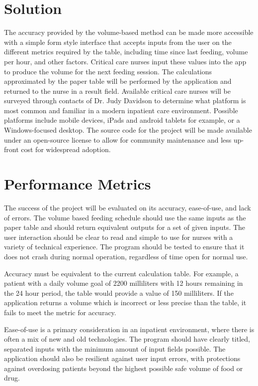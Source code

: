 \documentclass[10pt,draftclsnofoot,onecolumn]{IEEEtran}
\begin{document}
\section{Solution}
The accuracy provided by the volume-based method can be made more accessible with 
a simple form style interface that accepts inputs from the user on the different metrics required
by the table, including time since last feeding, volume per hour, and other factors. Critical care
nurses input these values into the app to produce the volume for the next feeding session. 
The calculations approximated by the paper table will be performed by the application  and
returned to the nurse in a result field.
Available
critical care nurses will be surveyed through contacts of Dr. Judy Davidson to determine what 
platform is most common and familiar in a modern inpatient care environment. Possible platforms
include mobile devices, iPads and android tablets for example, or a Windows-focused desktop.
The source code for the project will be made available under an open-source license to allow
for community maintenance and less up-front cost for widespread adoption.

\section{Performance Metrics}
The success of the project will be evaluated on its accuracy, ease-of-use, and lack of errors.
The volume based feeding schedule should use the same inputs as the paper table and should 
return equivalent outputs for a set of given inputs. The user interaction should be clear to read
and simple to use for nurses with a variety of technical experience. The program should be 
tested to ensure that it does not crash during normal operation, regardless of time open for normal
use.

Accuracy must be equivalent to the current calculation table.
For example, a patient with a daily volume
goal of 2200 milliliters with 12 hours remaining in the 24 hour period, the table would provide a 
value of 150 milliliters. 
If the application
returns a volume which is incorrect or less precise than the table, it fails to meet the metric for
accuracy. 

Ease-of-use is a primary consideration in an inpatient environment, where there is often a mix of new and old technologies.
The program should have clearly titled, separated inputs with the minimum amount of input fields
possible. The application should also
be resilient against user input errors, with protections against overdosing patients beyond the
highest possible safe volume of food or drug.
\end{document}
